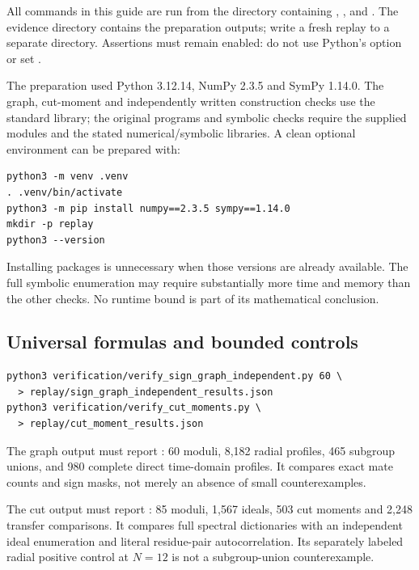 \documentclass[10pt]{article}
\begin{document}
All commands in this guide are run from the directory containing
, ,  and
. The evidence directory contains the preparation outputs;
write a fresh replay to a separate directory. Assertions must remain
enabled: do not use Python's  option or set
.

The preparation used Python 3.12.14, NumPy 2.3.5 and SymPy 1.14.0. The
graph, cut-moment and independently written construction checks use the
standard library; the original programs and symbolic checks require the
supplied modules and the stated numerical/symbolic libraries. A clean
optional environment can be prepared with:
\begin{lstlisting}
python3 -m venv .venv
. .venv/bin/activate
python3 -m pip install numpy==2.3.5 sympy==1.14.0
mkdir -p replay
python3 --version
\end{lstlisting}
Installing packages is unnecessary when those versions are already
available. The full symbolic enumeration may require substantially more
time and memory than the other checks. No runtime bound is part of its
mathematical conclusion.

\subsection{Universal formulas and bounded controls}
\begin{lstlisting}
python3 verification/verify_sign_graph_independent.py 60 \
  > replay/sign_graph_independent_results.json
python3 verification/verify_cut_moments.py \
  > replay/cut_moment_results.json
\end{lstlisting}
The graph output must report : 60 moduli, 8,182 radial
profiles, 465 subgroup unions, and 980 complete direct time-domain
profiles. It compares exact mate counts and sign masks, not merely an
absence of small counterexamples.

The cut output must report : 85 moduli, 1,567 ideals,
503 cut moments and 2,248 transfer comparisons. It compares full
spectral dictionaries with an independent ideal enumeration and literal
residue-pair autocorrelation. Its separately labeled radial positive
control at $N=12$ is not a subgroup-union counterexample.
\end{document}
